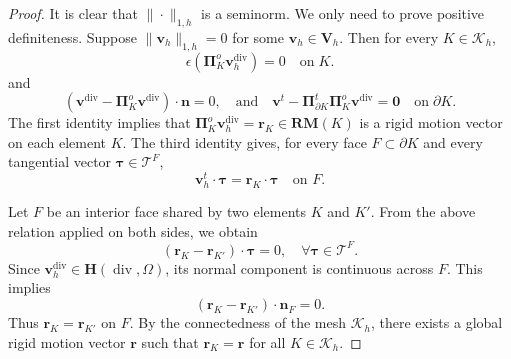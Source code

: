 \documentclass[review,hidelinks,onefignum,onetabnum]{siamart251216}
\begin{document}
\begin{proof}
It is clear that \(\|\cdot\|_{1,h}\) is a seminorm. We only need to prove positive definiteness. Suppose \(\|\boldsymbol{v}_h\|_{1,h}=0\) for some \(\boldsymbol{v}_h\in\boldsymbol{V}_h\). Then for every \(K\in\mathcal{K}_h\),
\[
\epsilon (\boldsymbol{\Pi}_K^o \boldsymbol{v}_h^{\operatorname{div}})=0
\quad\text{on} \;K.
\]
and
\[
(\boldsymbol{v}^{\operatorname{div}} - \boldsymbol{\Pi}_K^o \boldsymbol{v}^{\operatorname{div}}) \cdot \boldsymbol{n}=0,
\quad\text{and}\quad
\boldsymbol{v}^t - \boldsymbol{\Pi}_{\partial K}^t \boldsymbol{\Pi}_K^o \boldsymbol{v}^{\operatorname{div}}=\mathbf{0}
\quad\text{on} \;\partial K.
\]
The first identity implies that \(\boldsymbol{\Pi}_K^o \boldsymbol{v}_h^{\operatorname{div}}=\boldsymbol{r}_K\in \mathbf{RM}(K)\) is a rigid motion vector on each element \(K\). The third identity gives, for every face \(F\subset\partial K\) and every tangential vector \(\boldsymbol{\tau}\in\mathscr{T}^F\),
\[
\boldsymbol{v}_h^t\cdot\boldsymbol{\tau}=\boldsymbol{r}_K\cdot\boldsymbol{\tau} \quad\text{on }F.
\]

Let \(F\) be an interior face shared by two elements \(K\) and \(K'\). From the above relation applied on both sides, we obtain
\[
(\boldsymbol{r}_K-\boldsymbol{r}_{K'})\cdot\boldsymbol{\tau}=0,
\quad\forall \boldsymbol{\tau}\in\mathscr{T}^F.
\]
Since \(\boldsymbol{v}_h^{\operatorname{div}}\in\boldsymbol{H}(\operatorname{div},\Omega)\), its normal component is continuous across \(F\). This implies
\[
(\boldsymbol{r}_K-\boldsymbol{r}_{K'})\cdot\boldsymbol{n}_F=0.
\]
Thus \(\boldsymbol{r}_K=\boldsymbol{r}_{K'}\) on $F$. By the connectedness of the mesh \(\mathcal{K}_h\), there exists a global rigid motion vector \(\boldsymbol{r}\) such that \(\boldsymbol{r}_K=\boldsymbol{r}\) for all \(K\in\mathcal{K}_h\).


\end{proof}
\end{document}
